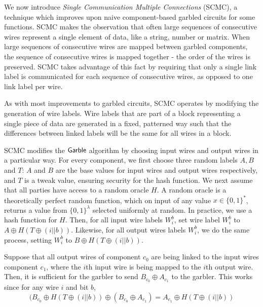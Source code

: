 We now introduce \textit{Single Communication Multiple Connections} (SCMC), a technique which improves upon naive component-based garbled circuits for some functions. 
SCMC makes the observation that often large sequences of consecutive wires represent a single element of data, like a string, number or matrix. 
When large sequences of consecutive wires are mapped between garbled components, the sequence of consecutive wires is mapped together - the order of the wires is preserved. 
SCMC takes advantage of this fact by requiring that only a single link label is communicated for each sequence of consecutive wires, as opposed to one link label per wire. 


As with most improvements to garbled circuits, SCMC operates by modifying the generation of wire labels. 
Wire labels that are part of a block representing a single piece of data are generated in a fixed, patterned way such that the differences between linked labels will be the same for all wires in a block. 

SCMC modifies the $\sf{Garble}$ algorithm by choosing input wires and output wires in a particular way. 
For every component, we first choose three random labels $A,B$ and $T$: $A$ and $B$ are the base values for input wires and output wires respectively, and $T$ is a tweak value, ensuring security for the hash function.
We next assume that all parties have access to a random oracle $H$. 
A random oracle is a theoretically perfect random function, which on input of any value $x \in \{0,1\}^*$, returns a value from $\{0,1\}^{\lambda}$ selected uniformly at random.
In practice, we use a hash function for $H$. 
Then, for all input wire labels $W_i^b$, set wire label $W_i^b$ to $A \oplus H(T \oplus (i || b))$. 
Likewise, for all output wires labels $W_i^b$, we do the same process, setting $W_i^b$ to $B \oplus H(T \oplus (i || b))$.

Suppose that all output wires of component $c_0$ are being linked to the input wires component $c_1$, where the $i$th input wire is being mapped to the $i$th output wire. 
Then, it is sufficient for the garbler to send $B_{c_0} \oplus A_{c_1}$ to the garbler. 
This works since for any wire $i$ and bit $b$,
\begin{equation}
(B_{c_0} \oplus H(T \oplus (i || b)) \oplus (B_{c_0} \oplus A_{c_1}) = A_{c_1} \oplus H(T \oplus (i || b))
\end{equation}

